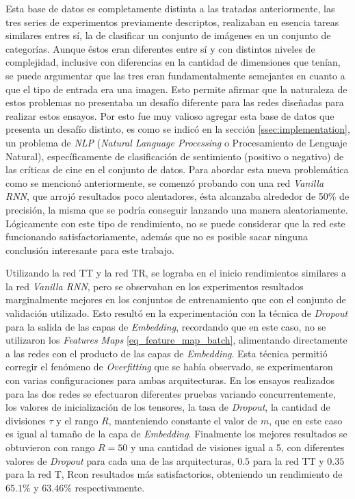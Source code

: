 \documentclass[spanish]{article}
\theoremstyle{definition}
\theoremstyle{remark}
\numberwithin{equation}{section}
\numberwithin{equation}{section} %
\begin{document}
Esta base de datos es completamente distinta a las tratadas anteriormente, las tres series de experimentos previamente descriptos, realizaban en esencia tareas similares entres sí, la de clasificar un conjunto de imágenes en un conjunto de categorías. Aunque éstos eran diferentes entre sí y con distintos niveles de complejidad, inclusive con diferencias en la cantidad de dimensiones que tenían, se puede argumentar que las tres eran fundamentalmente semejantes en cuanto a que el tipo de entrada era una imagen. Esto permite afirmar que la naturaleza de estos problemas no presentaba un desafío diferente para las redes diseñadas para realizar estos ensayos. Por esto fue muy valioso agregar esta base de datos que presenta un desafío distinto, es como se indicó en la sección \ref{ssec:implementation}, un problema de \textit{NLP} (\textit{Natural Language Processing} o Procesamiento de Lenguaje Natural), específicamente de clasificación de sentimiento (positivo o negativo) de las críticas de cine en el conjunto de datos. Para abordar esta nueva problemática como se mencionó anteriormente, se comenzó probando con una red \textit{Vanilla RNN}, que arrojó resultados poco alentadores, ésta alcanzaba alrededor de 50\% de precisión, la misma que se podría conseguir lanzando una manera aleatoriamente. Lógicamente con este tipo de rendimiento, no se puede considerar que la red este funcionando satisfactoriamente, además que no es posible sacar ninguna conclusión interesante para este trabajo. 
\par
Utilizando la red TT y la red TR, se lograba en el inicio rendimientos similares a la red \textit{Vanilla RNN}, pero se observaban en los experimentos resultados marginalmente mejores en los conjuntos de entrenamiento que con el conjunto de validación utilizado. Esto resultó en la experimentación con la técnica de \textit{Dropout} para la salida de las capas de \textit{Embedding}, recordando que en este caso, no se utilizaron los \textit{Features Maps} \eqref{eq_feature_map_batch}, alimentando directamente a las redes con el producto de las capas de \textit{Embedding}. Esta técnica permitió corregir el fenómeno de \textit{Overfitting} que se había observado, se experimentaron con varias configuraciones para ambas arquitecturas. En los ensayos realizados para las dos redes se efectuaron diferentes pruebas variando concurrentemente, los valores de inicialización de los tensores, la tasa de \textit{Dropout}, la cantidad de divisiones $\tau$ y el rango $R$, manteniendo constante el valor de $m$, que en este caso es igual al tamaño de la capa de \textit{Embedding}. Finalmente los mejores resultados se obtuvieron con rango $R=50$ y una cantidad de visiones igual a 5, con diferentes valores de \textit{Dropout} para cada una de las arquitecturas, $0.5$ para la red TT y $0.35$ para la red T, Rcon resultados más satisfactorios, obteniendo un rendimiento de $65.1\%$ y $63.46\%$ respectivamente. 
\end{document}
